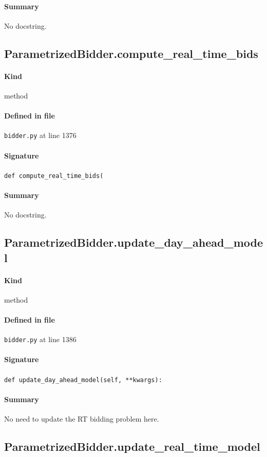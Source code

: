 \documentclass[11pt]{report}
\begin{document}
\paragraph{Summary} No docstring.
\subsection{ParametrizedBidder.compute\_real\_time\_bids}
\label{def:bidder.py:ParametrizedBidder.compute_real_time_bids:L1376}
\paragraph{Kind} method
\paragraph{Defined in file} \texttt{bidder.py} at line 1376
\paragraph{Signature} \texttt{def compute\_real\_time\_bids(}
\paragraph{Summary} No docstring.
\subsection{ParametrizedBidder.update\_day\_ahead\_model}
\label{def:bidder.py:ParametrizedBidder.update_day_ahead_model:L1386}
\paragraph{Kind} method
\paragraph{Defined in file} \texttt{bidder.py} at line 1386
\paragraph{Signature} \texttt{def update\_day\_ahead\_model(self, **kwargs):}
\paragraph{Summary} No need to update the RT bidding problem here.
\subsection{ParametrizedBidder.update\_real\_time\_model}
\label{def:bidder.py:ParametrizedBidder.update_real_time_model:L1398}
\end{document}
